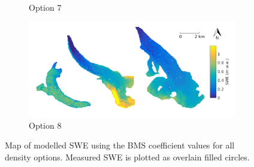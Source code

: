 \documentclass[12pt]{article}
\begin{document}
\begin{figure}
\begin{subfigure}[b]{0.475\textwidth}
            \caption[]%
            {{\small Option 7}}    
        \end{subfigure}
        \quad
        \begin{subfigure}[b]{0.475\textwidth}   
            \centering 
            \includegraphics[width=\textwidth]{BMSmap_Modelled_Observed_Opt8.png}
            \caption[]%
            {{\small Option 8}}    
        \end{subfigure}
              
        \caption[Map of modelled SWE using the BMS coefficient values for all density options. Measured SWE is plotted as overlain filled circles.]
        {\small Map of modelled SWE using the BMS coefficient values for all density options. Measured SWE is plotted as overlain filled circles.} 
        \label{fig:allBMSmodelled}
    \end{figure}
  
\end{document}
